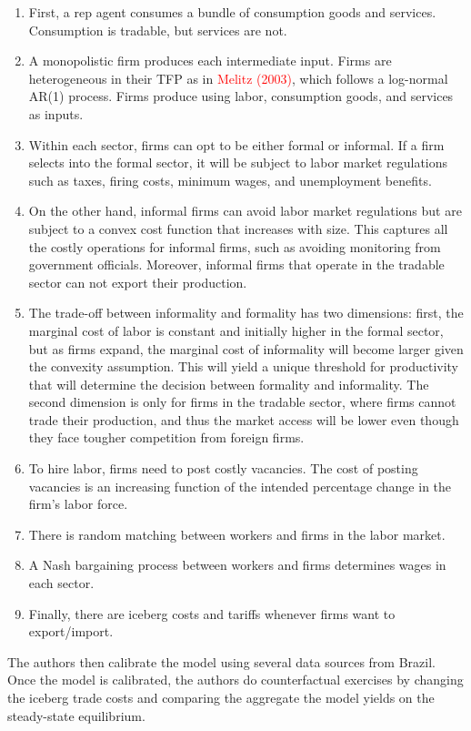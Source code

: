 \documentclass[12pt,oneside,reqno]{amsart}
\begin{document}
\begin{enumerate}[label=\arabic*.]
    \item First, a rep agent consumes a bundle of consumption goods and services. Consumption is tradable, but services are not.
    \item A monopolistic firm produces each intermediate input. Firms are heterogeneous in their TFP as in \textcolor{red}{Melitz (2003)}, which follows a log-normal AR(1) process. Firms produce using labor, consumption goods, and services as inputs.
    \item Within each sector, firms can opt to be either formal or informal. If a firm selects into the formal sector, it will be subject to labor market regulations such as taxes, firing costs, minimum wages, and unemployment benefits.
    \item On the other hand, informal firms can avoid labor market regulations but are subject to a convex cost function that increases with size. This captures all the costly operations for informal firms, such as avoiding monitoring from government officials. Moreover, informal firms that operate in the tradable sector can not export their production.
    \item The trade-off between informality and formality has two dimensions: first, the marginal cost of labor is constant and initially higher in the formal sector, but as firms expand, the marginal cost of informality will become larger given the convexity assumption. This will yield a unique threshold for productivity that will determine the decision between formality and informality. The second dimension is only for firms in the tradable sector, where firms cannot trade their production, and thus the market access will be lower even though they face tougher competition from foreign firms.
    \item  To hire labor, firms need to post costly vacancies. The cost of posting vacancies is an increasing function of the intended percentage change in the firm's labor force. 
    \item There is random matching between workers and firms in the labor market. 
    \item A Nash bargaining process between workers and firms determines wages in each sector. 
    \item Finally, there are iceberg costs and tariffs whenever firms want to export/import. 
\end{enumerate}
The authors then calibrate the model using several data sources from Brazil. Once the model is calibrated, the authors do counterfactual exercises by changing the iceberg trade costs and comparing the aggregate the model yields on the steady-state equilibrium. 
\end{document}
